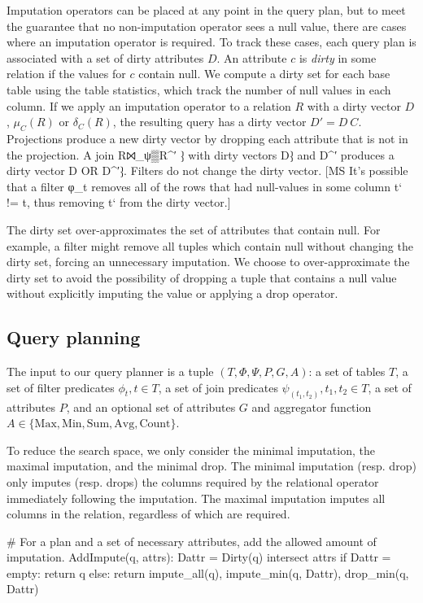 Imputation operators can be placed at any point in the query plan, but to meet the guarantee that no non-imputation operator sees a null value, there are cases where an imputation operator is required. To track these cases, each query plan is associated with a set of dirty attributes $D$. An attribute $c$ is \emph{dirty} in some relation if the values for $c$ contain null. We compute a dirty set for each base table using the table statistics, which track the number of null values in each column. If we apply an imputation operator to a relation $R$ with a dirty vector $D$, $\mu_C (R)$ or $\delta_C (R)$, the resulting query has a dirty vector $D' = D \ C$. Projections produce a new dirty vector by dropping each attribute that is not in the projection. A join R⨝_ψ▒R^′  ⁆ with dirty vectors D⁆ and D^′  produces a dirty vector D OR D^′⁆.  Filters do not change the dirty vector. [MS It's possible that a filter φ_t   removes all of the rows that had null-values in some column t` != t, thus removing t` from the dirty vector.] 

The dirty set over-approximates the set of attributes that contain null. For example, a filter might remove all tuples which contain null without changing the dirty set, forcing an unnecessary imputation. We choose to over-approximate the dirty set to avoid the possibility of dropping a tuple that contains a null value without explicitly imputing the value or applying a drop operator.

\subsection{Query planning}
The input to our query planner is a tuple $(T, \Phi, \Psi, P, G, A)$: a set of tables $T$, a set of filter predicates $\phi_t, t \in T$, a set of join predicates $\psi_(t_1, t_2), t_1, t_2 \in T$, a set of attributes $P$, and an optional set of attributes $G$ and aggregator function $A \in \{\text{Max}, \text{Min}, \text{Sum}, \text{Avg}, \text{Count}\}$.

To reduce the search space, we only consider the minimal imputation, the maximal imputation, and the minimal drop. The minimal imputation (resp. drop) only imputes (resp. drops) the columns required by the relational operator immediately following the imputation. The maximal imputation imputes all columns in the relation, regardless of which are required.

# For a plan and a set of necessary attributes, add the allowed amount of imputation.
AddImpute(q, attrs):
	Dattr = Dirty(q) intersect attrs
	if Dattr = empty:
		return {q}
	else:
		return {impute_all(q), impute_min(q, Dattr), drop_min(q, Dattr)}
		
